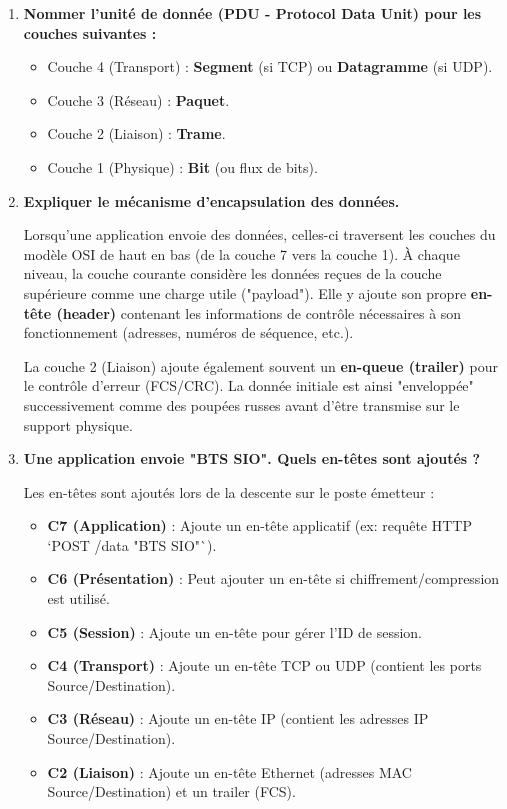 \documentclass[11pt, a4paper]{article}
\newenvironment{reponse}{\begin{reponsebox}}{\end{reponsebox}}
\begin{document}
\begin{enumerate}
    \item \textbf{Nommer l'unité de donnée (PDU - Protocol Data Unit) pour les couches suivantes :}
    \begin{itemize}
        \item Couche 4 (Transport) : \textbf{Segment} (si TCP) ou \textbf{Datagramme} (si UDP).
        \item Couche 3 (Réseau) : \textbf{Paquet}.
        \item Couche 2 (Liaison) : \textbf{Trame}.
        \item Couche 1 (Physique) : \textbf{Bit} (ou flux de bits).
    \end{itemize}

    \item \textbf{Expliquer le mécanisme d'encapsulation des données.}
    \begin{reponse}
    Lorsqu'une application envoie des données, celles-ci traversent les couches du modèle OSI de haut en bas (de la couche 7 vers la couche 1). À chaque niveau, la couche courante considère les données reçues de la couche supérieure comme une charge utile ("payload"). Elle y ajoute son propre \textbf{en-tête (header)} contenant les informations de contrôle nécessaires à son fonctionnement (adresses, numéros de séquence, etc.).

    La couche 2 (Liaison) ajoute également souvent un \textbf{en-queue (trailer)} pour le contrôle d'erreur (FCS/CRC). La donnée initiale est ainsi "enveloppée" successivement comme des poupées russes avant d'être transmise sur le support physique.
    \end{reponse}

    \item \textbf{Une application envoie "BTS SIO". Quels en-têtes sont ajoutés ?}
    \begin{reponse}
    Les en-têtes sont ajoutés lors de la descente sur le poste émetteur :
    \begin{itemize}
        \item \textbf{C7 (Application)} : Ajoute un en-tête applicatif (ex: requête HTTP `POST /data "BTS SIO"`).
        \item \textbf{C6 (Présentation)} : Peut ajouter un en-tête si chiffrement/compression est utilisé.
        \item \textbf{C5 (Session)} : Ajoute un en-tête pour gérer l'ID de session.
        \item \textbf{C4 (Transport)} : Ajoute un en-tête TCP ou UDP (contient les ports Source/Destination).
        \item \textbf{C3 (Réseau)} : Ajoute un en-tête IP (contient les adresses IP Source/Destination).
        \item \textbf{C2 (Liaison)} : Ajoute un en-tête Ethernet (adresses MAC Source/Destination) et un trailer (FCS).
    \end{itemize}
    \end{reponse}
\end{enumerate}
\clearpage
\end{document}
